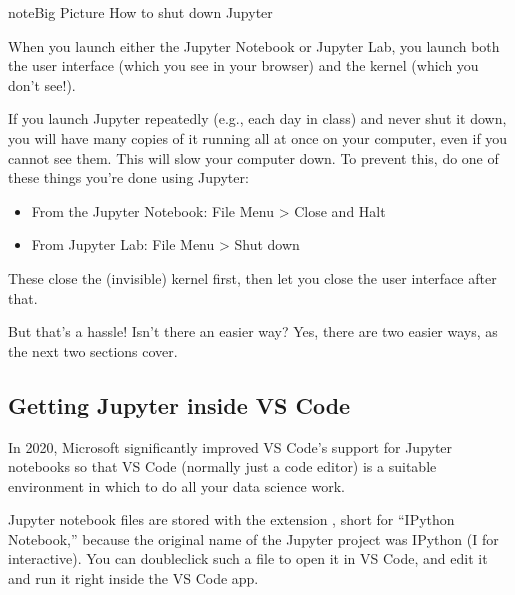 \documentclass[letterpaper,10pt,english]{jupyterBook}
\begin{document}
\begin{sphinxadmonition}{note}{Big Picture \sphinxhyphen{} How to shut down Jupyter}

\sphinxAtStartPar
When you launch either the Jupyter Notebook or Jupyter Lab, you launch both the user interface (which you see in your browser) and the kernel (which you don’t see!).  

\sphinxAtStartPar
If you launch Jupyter repeatedly (e.g., each day in class) and never shut it down, you will have many copies of it running all at once on your computer, even if you cannot see them.  This will slow your computer down.  To prevent this, do one of these things  you’re done using Jupyter:
\begin{itemize}
\item {} 
\sphinxAtStartPar
From the Jupyter Notebook: File Menu > Close and Halt

\item {} 
\sphinxAtStartPar
From Jupyter Lab: File Menu > Shut down

\end{itemize}

\sphinxAtStartPar
These close the (invisible) kernel first, then let you close the user interface after that.
\end{sphinxadmonition}

\sphinxAtStartPar
But that’s a hassle!  Isn’t there an easier way?  Yes, there are two easier ways, as the next two sections cover.


\subsection{Getting Jupyter inside VS Code}
\label{\detokenize{chapter-3-jupyter:getting-jupyter-inside-vs-code}}
\sphinxAtStartPar
In 2020, Microsoft significantly improved VS Code’s support for Jupyter notebooks so that VS Code (normally just a code editor) is a suitable environment in which to do all your data science work.

\sphinxAtStartPar
Jupyter notebook files are stored with the extension , short for “IPython Notebook,” because the original name of the Jupyter project was IPython (I for interactive).  You can double\sphinxhyphen{}click such a file to open it in VS Code, and edit it and run it right inside the VS Code app.
\end{document}
